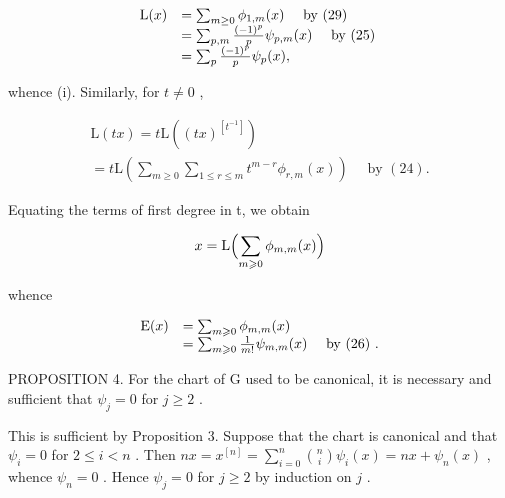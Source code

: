 \[
\begin{array}{r l} \mathrm{L} (x) & = \sum_ {m \geq 0} \phi_ {1, m} (x) \quad \text { by   (29) } \\ & = \sum_ {p, m} \frac {(- 1) ^ {p}}{p} \psi_ {p, m} (x) \quad \text { by   (25) } \\ & = \sum_ {p} \frac {(- 1) ^ {p}}{p} \psi_ {p} (x), \end{array}
\]

whence (i). Similarly, for \(t \neq 0\) ,

\[
\begin{array}{l} \mathrm{L} (t x) = t \mathrm{L} ((t x) ^ {[ t ^ {- 1} ]}) \\ = t \mathrm{L} \left(\sum_ {m \geqslant 0} \sum_ {1 \leqslant r \leqslant m} t ^ {m - r} \phi_ {r, m} (x)\right) \quad \text { by } (24). \end{array}
\]

Equating the terms of first degree in t, we obtain

\[
x = \mathrm{L} \Bigl (\sum_ {m \geqslant 0} \phi_ {m, m} (x) \Bigr)
\]

whence

\[
\begin{array}{r l} \mathrm{E} (x) & = \sum_ {m \geqslant 0} \phi_ {m, m} (x) \\ & = \sum_ {m \geqslant 0} \frac {1}{m !} \psi_ {m, m} (x) \quad \text { by   (26) }. \end{array}
\]

PROPOSITION 4. For the chart of G used to be canonical, it is necessary and sufficient that \(\psi_j = 0\) for \(j \geqslant 2\) .

This is sufficient by Proposition 3. Suppose that the chart is canonical and that \(\psi_{i} = 0\) for \(2 \leqslant i < n\) . Then \(nx = x^{[n]} = \sum_{i=0}^{n} \binom{n}{i} \psi_{i}(x) = nx + \psi_{n}(x)\) , whence \(\psi_{n} = 0\) . Hence \(\psi_{j} = 0\) for \(j \geqslant 2\) by induction on \(j\) .

